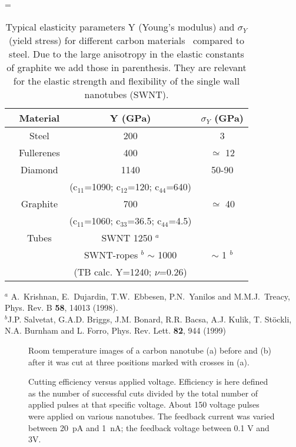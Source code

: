 \begin{multicols}{2}
 = \hbox{\cite{book1}}
\begin{table}
\caption{Typical elasticity parameters Y (Young's modulus) and
$\sigma_{Y}$ (yield stress) for different carbon materials~
compared to steel. Due to the large anisotropy in the elastic
constants of graphite we add those in parenthesis. They are
relevant for the elastic strength and flexibility of the single
wall nanotubes (SWNT).}
\begin{tabular}{c|c|c|c|}
& Material & Y (GPa) & $\sigma_{Y}$ (GPa) \\ \hline
& Steel & 200 & 3 \\
& Fullerenes & 400 & $\simeq$ 12 \\
& Diamond & 1140 & 50-90 \\
& & (c$_{11}$=1090; c$_{12}$=120; c$_{44}$=640) &  \\
& Graphite & 700 & $\simeq$ 40 \\
&  & (c$_{11}$=1060; c$_{33}$=36.5; c$_{44}$=4.5) &  \\
& Tubes & SWNT 1250 $^a$ &  \\
&  & SWNT-ropes $^b$ $\sim$ 1000 & $\sim$ 1 $^b$ \\
&  & (TB calc. Y=1240; $\nu$=0.26)\cite{Hernandez} &  \\
\end{tabular}
$^a$ A.~Krishnan, E.~Dujardin, T.W.~Ebbesen,
P.N.~Yanilos and M.M.J.~Treacy, Phys. Rev. B {\bf 58}, 14013 (1998).\\
$^b$J.P. Salvetat, G.A.D. Briggs, J.M. Bonard, R.R. Bacsa,
A.J. Kulik, T. St\"{o}ckli, N.A. Burnham and L. Forro, Phys. Rev.
Lett. {\bf 82}, 944 (1999)
\end{table}



\begin{figure}
\caption[]{ Room temperature images of a carbon nanotube (a)
before and (b) after it was cut at three positions marked with
crosses in (a).}
\end{figure}

\begin{figure}
\caption[]{Cutting efficiency versus applied voltage. Efficiency
is here defined as the number of successful cuts divided by the
total number of applied pulses at that specific voltage. About 150
voltage pulses were applied on various nanotubes. The feedback
current was varied between 20~pA and 1~nA; the feedback voltage
between 0.1 V and 3V.}
\end{figure}



\end{multicols}
